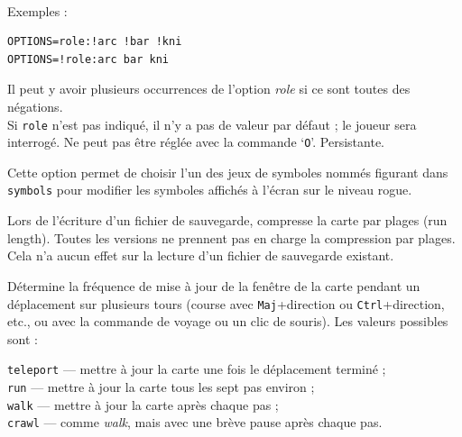 \documentclass[titlepage]{article}
\begin{document}
\begin{description}[font=\mdseries\itshape]
\\
Exemples :
\\
\begin{verbatim}
OPTIONS=role:!arc !bar !kni
OPTIONS=!role:arc bar kni
\end{verbatim}
Il peut y avoir plusieurs occurrences de l'option \textit{role}
si ce sont toutes des négations.
\\
Si \texttt{role} n'est pas indiqué, il n'y a pas de valeur par défaut ;
le joueur sera interrogé.
Ne peut pas être réglée avec la commande `\texttt{O}'. Persistante.
\item[roguesymset]
Cette option permet de choisir l'un des jeux de symboles nommés figurant dans
\texttt{symbols} pour modifier les symboles affichés à l'écran sur le
niveau rogue.
\item[rlecomp]
Lors de l'écriture d'un fichier de sauvegarde, compresse la carte par plages (run length).
Toutes les versions ne prennent pas en charge la compression par plages. Cela n'a aucun
effet sur la lecture d'un fichier de sauvegarde existant.
\item[runmode]
Détermine la fréquence de mise à jour de la fenêtre de la carte pendant un
déplacement sur plusieurs tours (course avec \texttt{Maj}+direction
ou \texttt{Ctrl}+direction,
etc., ou avec la commande de voyage ou un clic de souris).
Les valeurs possibles sont :

\texttt{teleport} --- mettre à jour la carte une fois le déplacement terminé ;\\
\texttt{run} --- mettre à jour la carte tous les sept pas environ ;\\
\texttt{walk} --- mettre à jour la carte après chaque pas ;\\
\texttt{crawl} --- comme \textit{walk}, mais avec une brève pause après chaque pas.


\end{description}
\end{document}
